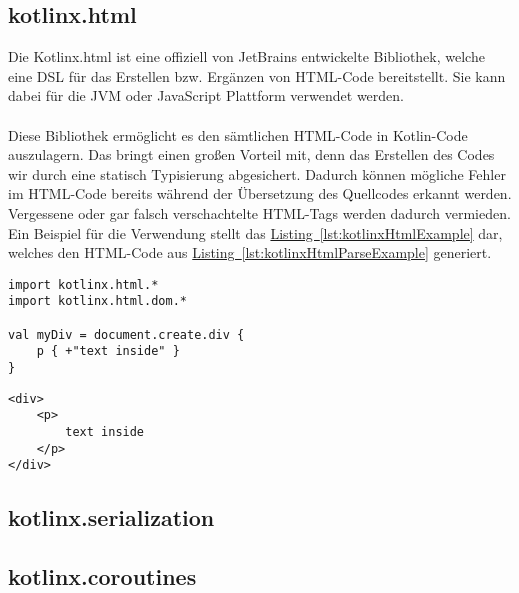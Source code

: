 \subsection{kotlinx.html}\label{sec:kotlinxHtml}
Die Kotlinx.html ist eine offiziell von JetBrains entwickelte Bibliothek, welche eine \gls{DSL} für das Erstellen bzw. Ergänzen von HTML-Code bereitstellt. Sie kann dabei für die \gls{JVM} oder JavaScript Plattform verwendet werden.\\
\\
Diese Bibliothek ermöglicht es den sämtlichen HTML-Code in Kotlin-Code auszulagern. Das bringt einen großen Vorteil mit, denn das Erstellen des Codes wir durch eine statisch Typisierung abgesichert. Dadurch können mögliche Fehler im HTML-Code bereits während der Übersetzung des Quellcodes erkannt werden. Vergessene oder gar falsch verschachtelte HTML-Tags werden dadurch vermieden. Ein Beispiel für die Verwendung stellt das \hyperref[lst:kotlinxHtmlExample]{Listing~\ref{lst:kotlinxHtmlExample}} dar, welches den HTML-Code aus \hyperref[lst:kotlinxHtmlParseExample]{Listing~\ref{lst:kotlinxHtmlParseExample}} generiert.
\begin{lstlisting}[style=lstStyleFramed, caption={Beispiel: Verwendung der Bibliothek kontlinx.html \cite{kotlinxExample}}, label=lst:kotlinxHtmlExample]
import kotlinx.html.*
import kotlinx.html.dom.*

val myDiv = document.create.div {
	p { +"text inside" }
}
\end{lstlisting}
\begin{lstlisting}[style=lstStyleFramed, caption={Beispiel: Verwendung der Bibliothek kotlinx.html (Ergebnis)}, label=lst:kotlinxHtmlParseExample]
<div>
	<p>
		text inside
	</p>
</div>
\end{lstlisting}

\subsection{kotlinx.serialization}\label{sec:kotlinxSerialization}


\subsection{kotlinx.coroutines}\label{sec:kotlinxCoroutines}


